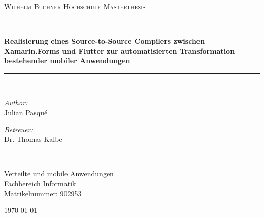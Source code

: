 \begin{titlepage}
\begin{center}
\newcommand{\HRule}{\rule{.9\linewidth}{.6pt}} %

\vspace*{.06\textheight}
{\scshape\LARGE Wilhelm Büchner Hochschule}\vspace{1.5cm} %
\textsc{\Large Masterthesis}\\[0.5cm] %

\HRule \\[0.4cm] %


\Large\textbf{Realisierung eines Source-to-Source Compilers zwischen Xamarin.Forms und Flutter zur automatisierten Transformation bestehender mobiler 
Anwendungen}\par


\HRule \\[1.5cm] %
 
\begin{minipage}[t]{0.4\textwidth}
\begin{flushleft} \large
\emph{Author:}\\
Julian Pasqué %
\end{flushleft}
\end{minipage}
\begin{minipage}[t]{0.4\textwidth}
\begin{flushright} \large
\emph{Betreuer:} \\
Dr. Thomas Kalbe %
\end{flushright}
\end{minipage}\\[3cm]
 
\vfill


\large Verteilte und mobile Anwendungen\\[0.8cm] %
\large Fachbereich Informatik\\[0.8cm] %
\large Matrikelnummer: 902953 \\[0.8cm] %
 
\vfill

{\large \today}\\[6cm] %
 
\vfill
\end{center}
\end{titlepage}